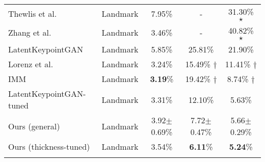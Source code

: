 \documentclass{article}
\begin{document}
\begin{table}[t]
{\begin{tabular}{llccc}
Thewlis et al. \cite{thewlis2017unsupervised} & Landmark & 7.95\% & - & \phantom{$\star$} 31.30\% $\star$ \\ 
Zhang et al. \cite{zhang2018unsupervised} & Landmark & 3.46\% & - & \phantom{$\star$} 40.82\% $\star$\\ 
LatentKeypointGAN \cite{he2021latentkeypointgan} & Landmark & 5.85\% & 25.81\% & 21.90\% \\
Lorenz et al. \cite{lorenz2019unsupervised} & Landmark & 3.24\% & \phantom{$\star$} 15.49\% $\dagger$ & \phantom{$\star$} 11.41\% $\dagger$\\
IMM \cite{jakab2018unsupervised} & Landmark &  \textbf{3.19}\% & \phantom{$\star$} 19.42\% $\dagger$ & \phantom{$\star$} \phantom{x} 8.74\% $\dagger$\\
LatentKeypointGAN-tuned \cite{he2021latentkeypointgan} & Landmark & 3.31\% & 12.10\% & \phantom{x} 5.63\% \\
Ours (general) & Landmark &  3.92$\pm$0.69\% & 7.72$\pm$0.47\% & 5.66$\pm$0.29\% \\
Ours (thickness-tuned) & Landmark &  3.54\% & \phantom{x}  \textbf{6.11}\% & \phantom{x}  \textbf{5.24}\% \\ \Xhline{1.5pt}
\end{tabular}}
\label{tab:celeba}
\end{table}
\end{document}
